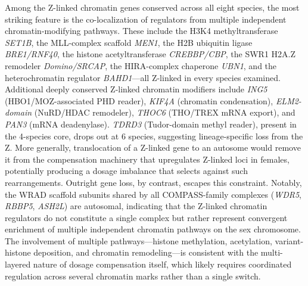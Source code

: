 \documentclass[12pt]{article}
\begin{document}
Among the Z-linked chromatin genes conserved across all eight species,
the most striking feature is the co-localization of regulators
from multiple independent chromatin-modifying pathways.
These include the H3K4 methyltransferase \textit{SET1B},
the MLL-complex scaffold \textit{MEN1},
the H2B ubiquitin ligase \textit{BRE1/RNF40},
the histone acetyltransferase \textit{CREBBP/CBP},
the SWR1 H2A.Z remodeler \textit{Domino/SRCAP},
the HIRA-complex chaperone \textit{UBN1},
and the heterochromatin regulator \textit{BAHD1}---all Z-linked in every species examined.
Additional deeply conserved Z-linked chromatin modifiers include
\textit{ING5} (HBO1/MOZ-associated PHD reader),
\textit{KIF4A} (chromatin condensation),
\textit{ELM2-domain} (NuRD/HDAC remodeler),
\textit{THOC6} (THO/TREX mRNA export), and \textit{PAN3} (mRNA deadenylase).
\textit{TDRD3} (Tudor-domain methyl reader), present in the 4-species core,
drops out at 6 species, suggesting lineage-specific loss from the Z.
More generally, translocation of a Z-linked gene to an autosome
would remove it from the compensation machinery that upregulates
Z-linked loci in females, potentially producing a dosage imbalance
that selects against such rearrangements.
Outright gene loss, by contrast, escapes this constraint.
Notably, the WRAD scaffold subunits shared by all COMPASS-family complexes
(\textit{WDR5}, \textit{RBBP5}, \textit{ASH2L}) are autosomal,
indicating that the Z-linked chromatin regulators
do not constitute a single complex
but rather represent convergent enrichment
of multiple independent chromatin pathways on the sex chromosome.
The involvement of multiple pathways---histone methylation, acetylation,
variant-histone deposition, and chromatin remodeling---is consistent
with the multi-layered nature of dosage compensation itself,
which likely requires coordinated regulation across several chromatin marks
rather than a single switch.
\end{document}
